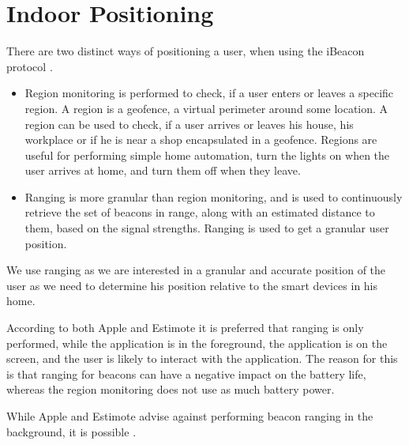\section{Indoor Positioning}
\label{sec:design:indoor-positioning}

There are two distinct ways of positioning a user, 
when using the iBeacon protocol \cite{estimote:monitoring-ranging}.

\begin{itemize}
\item Region monitoring is performed to check, if a user enters or leaves a specific region. A region is a geofence, \ie a virtual perimeter around some location. A region can be used to check, if a user arrives or leaves his house, his workplace or if he is near a shop encapsulated in a geofence. Regions are useful for performing simple home automation, \eg turn the lights on when the user arrives at home, and turn them off when they leave.
\item Ranging is more granular than region monitoring, and is used to continuously retrieve the set of beacons in range, along with an estimated distance to them, based on the signal strengths. Ranging is used to get a granular user position.
\end{itemize}

We use ranging as we are interested in a granular and accurate position of the user as
we need to determine his position relative to the smart devices in his home.

According to both Apple and Estimote it is preferred that ranging is only performed, 
while the application is in the foreground, 
\ie the application is on the screen, 
and the user is likely to interact with the application. 
The reason for this is that ranging for beacons can have a negative impact on the battery life, 
whereas the region monitoring does not use as much battery power.

While Apple and Estimote advise against performing beacon ranging in the background, 
it is possible \cite{apple:monitoring-ibeacon,estimote:monitoring-ranging}.



